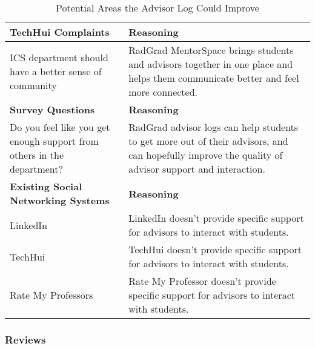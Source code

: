 \begin{table}[htbp!]
\centering
 \caption{Potential Areas the Advisor Log Could Improve}
\begin{tabular}{  |p{4cm}|p{12cm}| } 
\hline
 \textbf{TechHui Complaints} & \textbf{Reasoning} \\ 
  \hline
  ICS department should have a better sense of community & RadGrad MentorSpace brings students and advisors together in one place and helps them communicate better and feel more connected.\\
  \hline
 \textbf{Survey Questions} & \textbf{Reasoning} \\ 
  \hline
  Do you feel like you get enough support from others in the department? & RadGrad advisor logs can help students to get more out of their advisors, and can hopefully improve the quality of advisor support and interaction.\\
   \hline
   \textbf{Existing Social Networking Systems} & \textbf{Reasoning} \\ 
  \hline
  LinkedIn & LinkedIn doesn't provide specific support for advisors to interact with students. \\
    \hline
  TechHui & TechHui doesn't provide specific support for advisors to interact with students. \\
    \hline
  Rate My Professors & Rate My Professor doesn't provide specific support for advisors to interact with students. \\
    \hline\end{tabular}
\end{table}

\subsubsection{Reviews}

